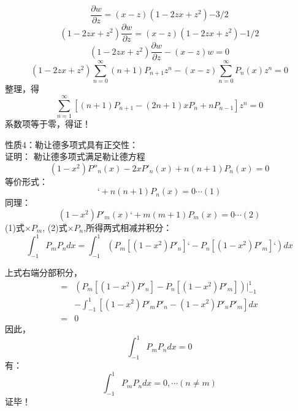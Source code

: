 \begin{frame}
	\begin{equation*}
		\frac{\partial w}{\partial z}=	(x-z)(1-2zx+z^2){-3/2}
	\end{equation*}		
	\begin{equation*}
		(1-2zx+z^2)\frac{\partial w}{\partial z}=(x-z)(1-2zx+z^2){-1/2}
	\end{equation*}		
	\begin{equation*}
		(1-2zx+z^2)\frac{\partial w}{\partial z}-(x-z)w=0
	\end{equation*}		
	\begin{equation*}
		(1-2zx+z^2)\sum_{n=0}^{\infty}(n+1) P_{n+1} z^{n}-(x-z)\sum_{n=0}^{\infty} P_{n}(x) z^{n}=0
	\end{equation*}		
	整理，得
	\begin{equation*}
		\sum_{n=1}^{\infty} [(n+1)P_{n+1} -(2n+1)x P_n + nP_{n-1} ] z^{n}=0
	\end{equation*}		
	系数项等于零，\alert{得证！}   	  
\end{frame}	

\begin{frame}
	\alert{性质4：}勒让德多项式具有正交性：\\
	\alert{证明：}  勒让德多项式满足勒让德方程
	\begin{equation*}
		\left(1-x^{2}\right) P'' _n  (x) -2 x P' _n (x)+n(n+1)P_n(x)=0
	\end{equation*}		
	等价形式：
	\begin{equation*}
		[\left(1-x^{2}\right) P' _n  (x)] ‘+n(n+1)P_n(x)=0    \cdots  (1)
	\end{equation*}		
	同理：
	\begin{equation*}
		{\left(1-x^{2}\right) P' _m  (x)} ‘+ m (m+1)P_m(x)=0    \cdots  (2)
	\end{equation*}		
	(1)式$\times P_m$, (2)式$\times P_n$,所得两式相减并积分： 
	{\small \begin{equation*}
			[n(n+1) -m (m+1)]\int_{-1}^{1} P_mP_n dx =\int_{-1}^{1} (P_m [\left(1-x^{2}\right) P' _n] ‘- P_n [\left(1-x^{2}\right) P' _m ]‘)dx
	\end{equation*}		}
\end{frame}	

\begin{frame}
	上式右端分部积分，
	\begin{equation*}
	\begin{split}
		= &(P_m [\left(1-x^{2}\right) P' _n] - P_n [\left(1-x^{2}\right) P' _m ])|_{-1} ^{1} \\ 
		&-\int_{-1}^{1}  [\left(1-x^{2}\right) P' _mP' _n -\left(1-x^{2}\right) P' _nP' _m  ]  dx \\
		=&0
	\end{split}
	\end{equation*}		
	因此，
	\begin{equation*}
		[n(n+1) -m (m+1)]\int_{-1}^{1} P_mP_n dx =0
	\end{equation*}	
	有：
	\begin{equation*}
		\int_{-1}^{1} P_mP_n dx =0 ,\cdots (n\ne m)
	\end{equation*}	
	\alert{证毕！} 
\end{frame}	

